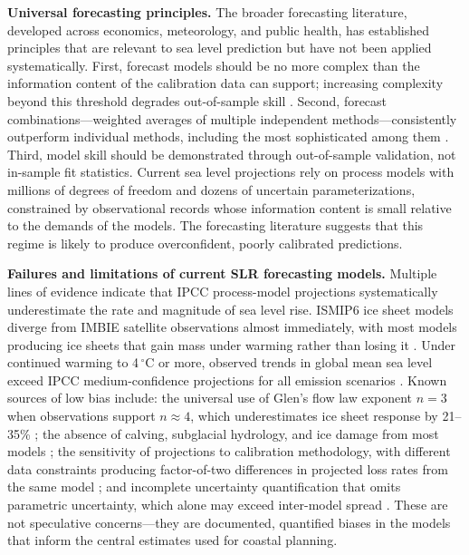 \documentclass[11pt]{article}
\begin{document}
\textbf{Universal forecasting principles.}
The broader forecasting literature, developed across economics, meteorology, and public health, has established principles that are relevant to sea level prediction but have not been applied systematically. First, forecast models should be no more complex than the information content of the calibration data can support; increasing complexity beyond this threshold degrades out-of-sample skill \citep{Green2015}. Second, forecast combinations---weighted averages of multiple independent methods---consistently outperform individual methods, including the most sophisticated among them \citep{Makridakis2020}. Third, model skill should be demonstrated through out-of-sample validation, not in-sample fit statistics. Current sea level projections rely on process models with millions of degrees of freedom and dozens of uncertain parameterizations, constrained by observational records whose information content is small relative to the demands of the models. The forecasting literature suggests that this regime is likely to produce overconfident, poorly calibrated predictions.

\textbf{Failures and limitations of current SLR forecasting models.}
Multiple lines of evidence indicate that IPCC process-model projections systematically underestimate the rate and magnitude of sea level rise. ISMIP6 ice sheet models diverge from IMBIE satellite observations almost immediately, with most models producing ice sheets that gain mass under warming rather than losing it \citep{Aschwanden2021, Fricker2025}. Under continued warming to 4$\,^\circ$C or more, observed trends in global mean sea level exceed IPCC medium-confidence projections for all emission scenarios \citep{Hamlington2025}. Known sources of low bias include: the universal use of Glen's flow law exponent $n = 3$ when observations support $n \approx 4$, which underestimates ice sheet response by 21--35\% \citep{Millstein2022, Martin2026}; the absence of calving, subglacial hydrology, and ice damage from most models \citep{Aschwanden2021}; the sensitivity of projections to calibration methodology, with different data constraints producing factor-of-two differences in projected loss rates from the same model \citep{Goldberg2026}; and incomplete uncertainty quantification that omits parametric uncertainty, which alone may exceed inter-model spread \citep{Aschwanden2019}. These are not speculative concerns---they are documented, quantified biases in the models that inform the central estimates used for coastal planning.
\end{document}
